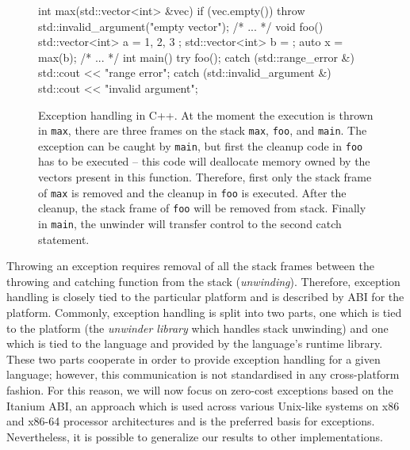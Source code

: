 \begin{figure}[t]
  \begin{cppcode}
    int max(std::vector<int> &vec) {
        if (vec.empty())
            throw std::invalid_argument("empty vector");
        /* ... */
    }
    void foo() {
        std::vector<int> a = { 1, 2, 3 };
        std::vector<int> b = {};
        auto x = max(b);
        /* ... */
    }
    int main() {
        try {
            foo();
        } catch (std::range_error &) {
            std::cout << "range error\n";
        } catch (std::invalid_argument &) {
            std::cout << "invalid argument\n";
        }
    }
  \end{cppcode}
\caption{Exception handling in C++.
  At the moment the execution is thrown in \texttt{max}, there are three frames
  on the stack \texttt{max}, \texttt{foo}, and \texttt{main}.
  The exception can be caught by \texttt{main}, but first the cleanup code
  in \texttt{foo} has to be executed -- this code will deallocate memory owned
  by the vectors present in this function.
  Therefore, first only the stack frame of \texttt{max} is removed and the
  cleanup in \texttt{foo} is executed.
  After the cleanup, the stack frame of \texttt{foo} will be removed from
  stack.
  Finally in \texttt{main}, the unwinder will transfer control to the second
  catch statement.
}\label{fig:lang:exceptcpp}
\end{figure}

Throwing an exception requires removal of all the stack frames
between the throwing and catching function from the stack (\emph{unwinding}).
Therefore, exception handling is closely tied to the particular platform and is
described by ABI for the platform.
Commonly, exception handling is split into two parts, one which is tied to the
platform (the \emph{unwinder library} which handles stack unwinding) and one
which is tied to the language and provided by the language's runtime
library.
These two parts cooperate in order to provide exception handling for a
given language; however, this communication is not standardised in any
cross-platform fashion.
For this reason, we will now focus on zero-cost exceptions based on the Itanium
ABI, an approach which is used across various Unix-like systems on x86
and x86-64 processor architectures and is the preferred basis for
\llvm{} exceptions.
Nevertheless, it is possible to generalize our results to other
implementations.

